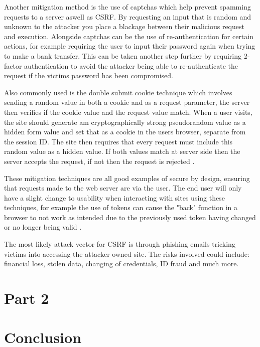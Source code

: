 \documentclass{ueacmpstyle}
\begin{document}
      Another mitigation method is the use of captchas which help prevent spamming requests 
      to a server aswell as CSRF. By requesting an input that is random and unknown to the 
      attacker you place a blackage between their malicious request and execution. 
      Alongside captchas can be the use of re-authentication for certain actions, for example 
      requiring the user to input their password again when trying to make a bank transfer. 
      This can be taken another step further by requiring 2-factor authentication to avoid 
      the attacker being able to re-authenticate the request if the victims password has been 
      compromised.

      Also commonly used is the double submit cookie technique which involves sending a random 
      value in both a cookie and as a request parameter, the server then verifies if the 
      cookie value and the request value match. When a user visits, the site should generate 
      am cryptographically strong pseudorandom value as a hidden form value and set that as 
      a cookie in the users browser, separate from the session ID. The site then requires that 
      every request must include this random value as a hidden value. If both values match at 
      server side then the server accepts the request, if not then the request is rejected 
      \citep{OWASPCSRFPrevention}.

      These mitigation techniques are all good examples of secure by design, ensuring that 
      requests made to the web server are via the user. The end user will only have a slight 
      change to usability when interacting with sites using these techniques, for example the 
      use of tokens can cause the "back" function in a browser to not work as intended due to 
      the previously used token having changed or no longer being valid \citep{OWASPCSRFPrevention}.
      
      The most likely attack vector for CSRF is through phishing emails tricking victims into 
      accessing the attacker owned site. The risks involved could include: financial loss, 
      stolen data, changing of credentials, ID fraud and much more. 
        
    \section{Part 2}\label{sec:Pt2}


    \section{Conclusion}\label{sec:Con}
\end{document}
